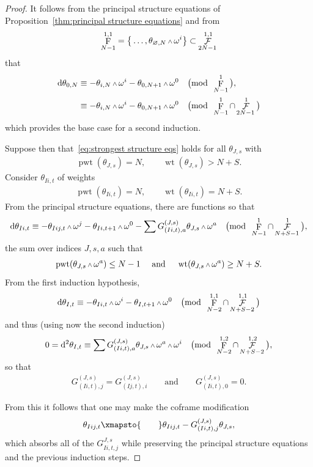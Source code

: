 \documentclass[10pt,a4paper]{amsart}
\renewcommand{\d}{{\rm d}}
\renewcommand{\mod}[1]{\quad\big(\mathrm{mod\enspace} #1\big)}
\newcommand{\w}{{\mathchoice{\,{\scriptstyle\wedge}\,}{{\scriptstyle\wedge}}
 {{\scriptscriptstyle\wedge}}{{\scriptscriptstyle\wedge}}}}
\newcommand{\thetas}[1]{\theta_{#1}}
\DeclareMathOperator{\pwf}{F}
\DeclareMathOperator{\swf}{\mathcal{F}}
\DeclareMathOperator{\wt}{\mathrm{wt}}
\DeclareMathOperator{\pwt}{\mathrm{pwt}}
\numberwithin{equation}{section}
\begin{document}
\begin{Example}
\begin{proof}
 It follows from the principal structure equations of Proposition~\ref{thm:principal structure equations} and from
 \begin{gather*}
 \pwf^{1,1}_{N-1} = \big\{\dots, \thetas{\varnothing,N}\w\omega^i\big\} \subset \swf^{1,1}_{2N-1}
 \end{gather*}
 that
 \begin{align*}
 \d\theta_{0,N} & \equiv -\thetas{i,N}\w\omega^i - \thetas{0,N+1}\w\omega^0 \mod{\pwf^1_{N-1}}, \\
 & \equiv -\thetas{i,N}\w\omega^i - \thetas{0,N+1}\w\omega^0 \mod{\pwf^1_{N-1}\cap\swf^1_{2N-1}}
 \end{align*}
 which provides the base case for a second induction.

 Suppose then that~\eqref{eq:strongest structure eqs} holds for all $\thetas{J,s}$ with
 \begin{gather*}
 \pwt(\thetas{J,s}) = N , \qquad \wt(\thetas{J,s}) > N + S .
 \end{gather*}
 Consider $\thetas{Ii,t}$ of weights
 \begin{gather*}
 \pwt(\thetas{Ii,t}) = N, \qquad \wt(\thetas{Ii,t}) = N + S .
 \end{gather*}
 From the principal structure equations, there are functions so that
 \begin{gather*}
 \d\thetas{Ii,t} \equiv -\thetas{Iij,t}\w\omega^j - \thetas{Ii,t+1}\w\omega^0 - \sum G^{(J,s)}_{(Ii,t),a}\thetas{J,s}\w\omega^a \mod{\pwf^1_{N-1}\cap\swf^1_{N+S-1}} ,
 \end{gather*}
 the sum over indices $J, s, a$ such that
 \begin{gather*}
 \pwt(\thetas{J,s}\w\omega^a) \le N-1 \quad \mbox{ and } \quad \wt(\thetas{J,s}\w\omega^a) \ge N + S .
 \end{gather*}
 From the first induction hypothesis,
 \begin{gather*}
 \d\thetas{I,t} \equiv - \thetas{Ii,t}\w\omega^i - \thetas{I,t+1}\w\omega^0 \mod{\pwf^{1,1}_{N-2}\cap\swf^{1,1}_{N+S-2}}
 \end{gather*}
 and thus (using now the second induction)
 \begin{gather*}
 0 = \d^2\thetas{I,t} \equiv \sum G^{(J,s)}_{(Ii,t),a}\thetas{J,s}\w\omega^a\w\omega^i \mod{\pwf^{1,2}_{N-2}\cap\swf^{1,2}_{N+S-2}} ,
 \end{gather*}
 so that
 \begin{gather*}
 G^{(J,s)}_{(Ii,t),j} = G^{(J,s)}_{(Ij,t),i} \qquad \text{and} \qquad G^{(J,s)}_{(Ii,t),0} = 0 .
 \end{gather*}

 From this it follows that one may make the coframe modification
 \begin{gather*}
 \thetas{Iij,t} \xmapsto{\qquad} \thetas{Iij,t} - G^{(J,s)}_{(Ii,t),j}\thetas{J,s} ,
 \end{gather*}
 which absorbs all of the $G^{J,s}_{Ii,t,j}$ while preserving the principal structure equations and the previous induction steps.
 \end{proof}

\end{Example}
\end{document}
